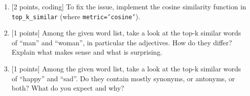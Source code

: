 \documentclass{article}
\theoremstyle{case}
\theoremstyle{definition}
\begin{document}
\begin{enumerate}
    \newpage
    \item {[2 points, coding]} To fix the issue, implement the cosine similarity function in \texttt{top\_k\_similar} (where \texttt{metric='cosine'}).
        \begin{shaded}
            
        \end{shaded}

    \newpage
    \item {[1 points]} Among the given word list, take a look at the top-k similar words of ``man'' and ``woman'', in particular the adjectives. How do they differ? Explain what makes sense and what is surprising.
        \begin{shaded}
        \end{shaded}

    \newpage
    \item {[1 points]} Among the given word list, take a look at the top-k similar words of ``happy'' and ``sad''. Do they contain mostly synonyms, or antonyms, or both? What do you expect and why? 
        \begin{shaded}
        \end{shaded}

\end{enumerate}

\newpage
\end{document}
